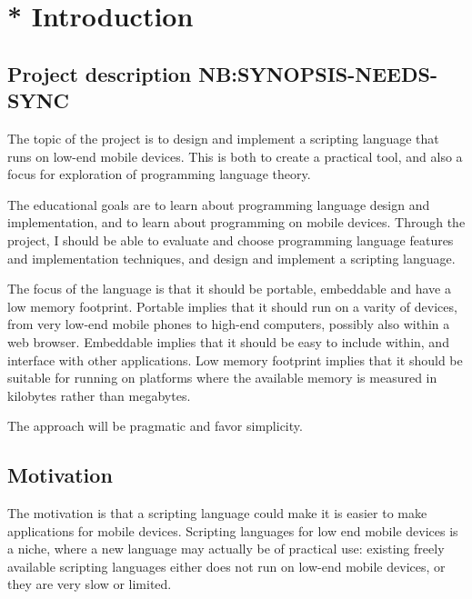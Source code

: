 \chapter{* Introduction}
\section{Project description NB:SYNOPSIS-NEEDS-SYNC}
    The topic of the project is to design and implement a scripting language
that runs on low-end mobile devices. This is both to create a practical tool, and
also a focus for exploration of programming language theory. 

\begin{comment}
The motivation is that a scripting language makes it is easier to make applications for mobile 
devices, and that existing freely available scripting languages
are very limited, slow, or simply does not run on the low-end mobile devices.
\end{comment}

    The educational goals are to learn about programming language design and
implementation, and to learn about programming on mobile devices. Through the
project, I should be able to evaluate and choose programming language features
and implementation techniques, and design and implement a scripting language.

    The focus of the language is that it should be portable, embeddable and have
a low memory footprint. Portable implies that it should run on a varity of devices,
from very low-end mobile phones to high-end computers, possibly also within a web browser. 
Embeddable implies that it should be easy to include within, and interface with
other applications. Low memory footprint implies that it should be suitable for
running on platforms where the available memory is measured in kilobytes rather
than megabytes. 

    The approach will be pragmatic and favor simplicity.

\section{Motivation}

The motivation is that a scripting language could make it is easier to make applications for mobile devices.
Scripting languages for low end mobile devices is a niche, 
where a new language may actually be of practical use:
existing freely available scripting languages either does not run on low-end mobile devices, or they are very slow or limited.

